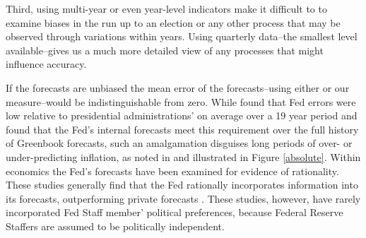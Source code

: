 \documentclass[a4paper]{article}\usepackage{graphicx, color}
\begin{document}
Third, using multi-year or even year-level indicators make it difficult to to examine biases in the run up to an election or any other process that may be observed through variations within years. Using quarterly data--the smallest level available--gives us a much more detailed view of any processes that might influence accuracy.

If the forecasts are unbiased the mean error of the forecasts--using either \cite{Frendreis2000} or our measure--would be indistinguishable from zero. While \cite{Frendreis2000} found that Fed errors were low relative to presidential administrations' on average over a 19 year period and \cite{Romer2000} found that the Fed's internal forecasts  meet this requirement over the full history of Greenbook forecasts, such an amalgamation disguises long periods of over- or under-predicting inflation, as noted in \cite{Capistran2006} and illustrated in Figure \ref{absolute}. Within economics the Fed's forecasts have been examined for evidence of rationality. These studies generally find that the Fed rationally incorporates information into its forecasts, outperforming private forecasts \cite[c.f.][]{Gamber2009}. These studies, however, have rarely incorporated Fed Staff member' political preferences, because Federal Reserve Staffers are assumed to be politically independent.
\end{document}
